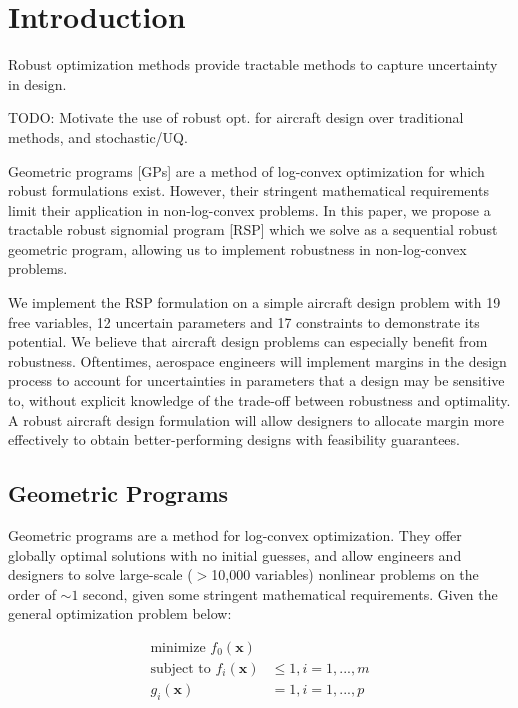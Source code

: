 \section{Introduction}
Robust optimization methods provide tractable methods to capture uncertainty in design.

TODO: Motivate the use of robust opt. for aircraft design over traditional methods, and stochastic/UQ.

Geometric programs [GPs] are a method of log-convex optimization for which robust formulations exist. However, their stringent mathematical requirements limit their application in non-log-convex problems. In this paper, we propose a tractable robust signomial program [RSP] which we solve as a sequential robust geometric program, allowing us to implement robustness in non-log-convex problems.

We implement the RSP formulation on a simple aircraft design problem with 19 free variables, 12 uncertain parameters and 17 constraints to demonstrate its potential. We believe that aircraft design problems can especially benefit from robustness. Oftentimes, aerospace engineers will implement margins in the design process to account for uncertainties in parameters that a design may be sensitive to, without explicit knowledge of the trade-off between robustness and optimality. A robust aircraft design formulation will allow designers to allocate margin more effectively to obtain better-performing designs with feasibility guarantees.

\cite{yao2011}

\subsection{Geometric Programs}

Geometric programs are a method for log-convex optimization. They offer globally optimal solutions with no initial guesses, and allow engineers and designers to solve large-scale ($>$10,000 variables) nonlinear problems on the order of $\sim1$ second, given some stringent mathematical requirements. Given the general optimization problem below:

\begin{align}
\label{e:gpform}
\textrm{minimize } f_0(\mathbf{x}) & \nonumber \\
\textrm{subject to } f_i(\mathbf{x}) &\leq 1, i=1,...,m \\
g_i (\mathbf{x}) &= 1, i = 1,...,p \nonumber
\end{align}

